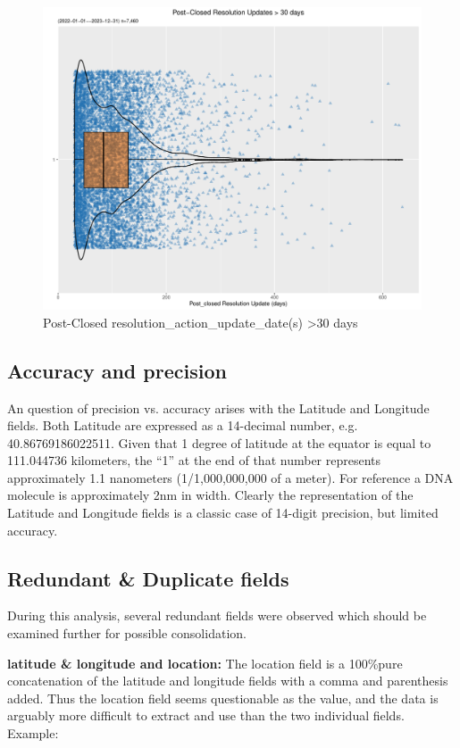 \documentclass[linenumber]{jdsart}
\begin{document}
	
\begin{figure}[tbp]
	\centering
	\includegraphics[width = \textwidth]{post_closed_violin_chart.pdf}
	\caption{Post-Closed resolution\_action\_update\_date(s) \textgreater30 days}
	\label{fig:resolution-violin}
\end{figure}		

	
\subsection{Accuracy and precision}
\label{sec:precision}
An question of precision vs. accuracy arises with the Latitude 
and Longitude fields. Both Latitude are expressed as 
a 14-decimal number, e.g. 40.86769186022511. Given 
that 1 degree of latitude at the equator is equal to 111.044736 
kilometers, the ``1'' at the end of that number represents 
approximately 1.1 nanometers (1/1,000,000,000 of a meter). For 
reference a DNA molecule is approximately 2nm in width. Clearly 
the representation of the Latitude and Longitude fields is a 
classic case of 14-digit precision, but limited accuracy. 


\subsection{Redundant \& Duplicate fields}
\label{sec:duplicates}
During this analysis, several redundant fields were observed which
should be examined further for possible consolidation.


\label{sec:latlong}
\textbf{latitude \& longitude and location:} The location 
field is a 100\%pure concatenation of the latitude 
and longitude fields with a comma and parenthesis 
added. Thus the  location field seems questionable as the value, 
and the data is arguably more difficult to 
extract and use than the two individual fields. Example:  
\end{document}
